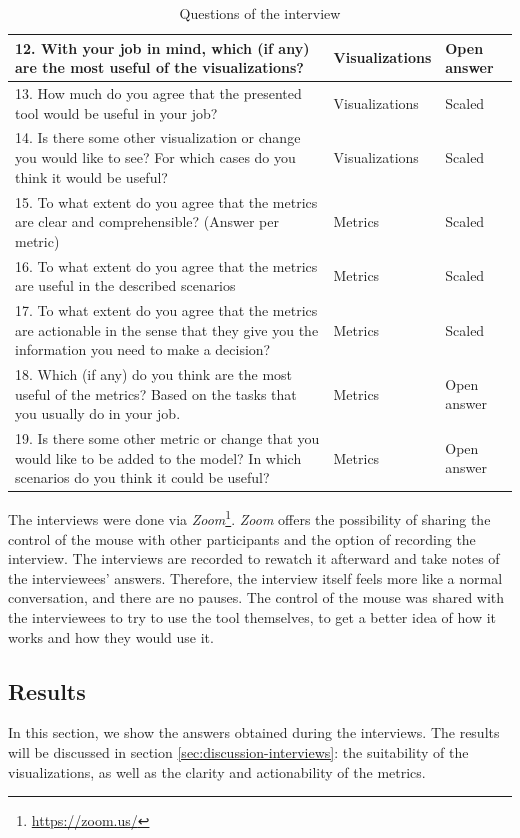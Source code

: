 \begin{table}[p]
\begin{center}
\begin{tabularx}{\textwidth}{|X|l|l|}
    12.	With your job in mind, which (if any) are the most useful of the visualizations? & Visualizations & Open answer \\\hline
    13.	How much do you agree that the presented tool would be useful in your job? & Visualizations & Scaled \\\hline
    14.	Is there some other visualization or change you would like to see? For which cases do you think it would be useful? & Visualizations & Scaled \\\hline
    \hline
    15.	To what extent do you agree that the metrics are clear and comprehensible? (Answer per metric) & Metrics & Scaled \\\hline
    16.	To what extent do you agree that the metrics are useful in the described scenarios & Metrics & Scaled \\\hline
    17.	To what extent do you agree that the metrics are actionable in the sense that they give you the information you need to make a decision? & Metrics & Scaled \\\hline
    18.	Which (if any) do you think are the most useful of the metrics? Based on the tasks that you usually do in your job. & Metrics & Open answer \\\hline
    19.	Is there some other metric or change that you would like to be added to the model? In which scenarios do you think it could be useful? & Metrics & Open answer \\\hline
    \end{tabularx}
    \end{center}
    \caption{Questions of the interview}
    \label{table:interview-questions}
\end{table}

The interviews were done via \textit{Zoom}\footnote{\url{https://zoom.us/}}. \textit{Zoom} offers the possibility of sharing the control of the mouse with other participants and the option of recording the interview. The interviews are recorded to rewatch it afterward and take notes of the interviewees' answers. Therefore, the interview itself feels more like a normal conversation, and there are no pauses. The control of the mouse was shared with the interviewees to try to use the tool themselves, to get a better idea of how it works and how they would use it.

\subsection{Results}
In this section, we show the answers obtained during the interviews. The results will be discussed in section \ref{sec:discussion-interviews}: the suitability of the visualizations, as well as the clarity and actionability of the metrics.


